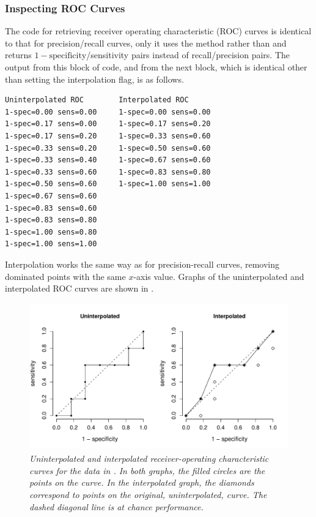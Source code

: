 \subsubsection{Inspecting ROC Curves}

The code for retrieving receiver operating characteristic (ROC) curves
is identical to that for precision/recall curves, only it uses the
method  rather than 
and returns $1-\mbox{specificity}$/sensitivity pairs instead of
recall/precision pairs.
%
%
The output from this block of code, and from the next block, which is
identical other than setting the interpolation flag, is as follows.
%
\begin{verbatim}
Uninterpolated ROC        Interpolated ROC
1-spec=0.00 sens=0.00     1-spec=0.00 sens=0.00
1-spec=0.17 sens=0.00     1-spec=0.17 sens=0.20
1-spec=0.17 sens=0.20     1-spec=0.33 sens=0.60
1-spec=0.33 sens=0.20     1-spec=0.50 sens=0.60
1-spec=0.33 sens=0.40     1-spec=0.67 sens=0.60
1-spec=0.33 sens=0.60     1-spec=0.83 sens=0.80
1-spec=0.50 sens=0.60     1-spec=1.00 sens=1.00
1-spec=0.67 sens=0.60
1-spec=0.83 sens=0.60
1-spec=0.83 sens=0.80
1-spec=1.00 sens=0.80
1-spec=1.00 sens=1.00
\end{verbatim}
%
Interpolation works the same way as for precision-recall curves,
removing dominated points with the same $x$-axis value.  
Graphs of the uninterpolated and interpolated ROC curves are shown in 
.
%
\begin{figure}
\begin{center}
\includegraphics[height=2.5in]{pdfs/roc-curves.pdf}
\vspace*{-24pt}
\end{center}
\caption{\it Uninterpolated and interpolated receiver-operating
  characteristic curves for the data in .  In
  both graphs, the filled circles are the points on the curve.  In the
  interpolated graph, the diamonds correspond to points on the
  original, uninterpolated, curve.  The dashed diagonal line is
  at chance performance.}\label{fig:roc-curves}
\end{figure}



